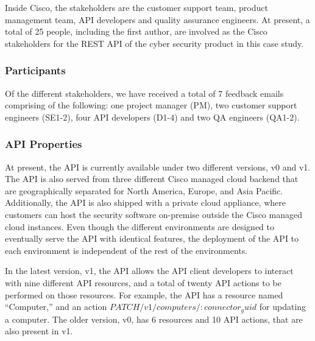\documentclass[10pt, conference]{IEEEtran}
\begin{document}
Inside Cisco, the stakeholders are the customer support team, product management team, API developers and quality assurance engineers. At present, a total of 25 people, including the first author, are involved as the Cisco stakeholders for the REST API of the cyber security product in this case study.

\subsubsection{Participants}
Of the different stakeholders, we have received a total of 7 feedback emails comprising of the following: one project manager (PM), two customer support engineers (SE1-2), four API developers (D1-4) and two QA engineers (QA1-2).

\subsubsection{API Properties} %
At present, the API is currently available under two different versions, v0 and v1. The API is also served from three different Cisco managed cloud backend that are geographically separated for North America, Europe, and Asia Pacific. Additionally, the API is also shipped with a private cloud appliance, where customers can host the security software on-premise outside the Cisco managed cloud instances. Even though the different environments are designed to eventually serve the API with identical features, the deployment of the API to each environment is independent of the rest of the environments.

In the latest version, v1, the API allows the API client developers to interact with nine different API resources, and a total of twenty API actions to be performed on those resources. For example, the API has a resource named ``Computer,'' and an action $PATCH /v1/computers/{:connector_guid}$ for updating a computer. The older version, v0, has 6 resources and 10 API actions, that are also present in v1.
\end{document}
